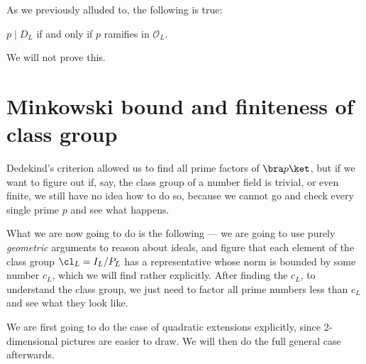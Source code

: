 \documentclass[a4paper]{article}
\begin{document}
As we previously alluded to, the following is true:
\begin{thm}
  $p \mid D_L$ if and only if $p$ ramifies in $\mathcal{O}_L$.
\end{thm}

We will not prove this.

\section{Minkowski bound and finiteness of class group}
Dedekind's criterion allowed us to find all prime factors of $\bra p\ket$, but if we want to figure out if, say, the class group of a number field is trivial, or even finite, we still have no idea how to do so, because we cannot go and check every single prime $p$ and see what happens.


What we are now going to do is the following --- we are going to use purely \emph{geometric} arguments to reason about ideals, and figure that each element of the class group $\cl_L = I_L/P_L$ has a representative whose norm is bounded by some number $c_L$, which we will find rather explicitly. After finding the $c_L$, to understand the class group, we just need to factor all prime numbers less than $c_L$ and see what they look like.

We are first going to do the case of quadratic extensions explicitly, since 2-dimensional pictures are easier to draw. We will then do the full general case afterwards.
\end{document}
